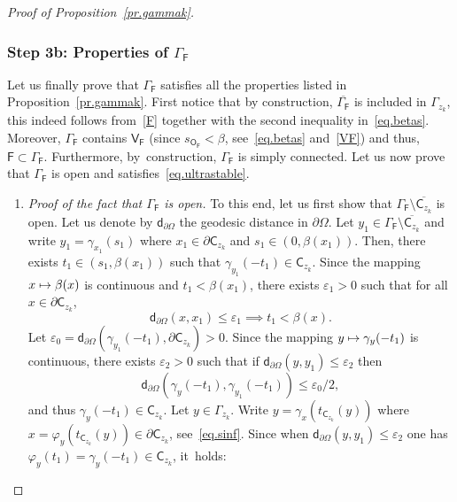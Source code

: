 \documentclass[10pt]{amsart}
\newcommand\mto{\mathchoice{\longmapsto}{\mapsto}{\mapsto}{\mapsto}}
\let\pa\partial
\let\ve\varepsilon
\theoremstyle{plain}
\theoremstyle{definition}
\begin{document}
\begin{proof}[Proof of Proposition~\ref{pr.gammak}]
\subsubsection*{Step 3b: Properties of $ \Gamma_{\mathsf F}$} Let us finally prove that $ \Gamma_{\mathsf F}$ satisfies all the properties listed in Proposition~\ref{pr.gammak}. First notice that by construction, $\overline{ \Gamma_{\mathsf F}}$ is included in $\Gamma_{z_k}$, this indeed follows from~\eqref{F} together with the second inequality in~\eqref{eq.betas}. Moreover, $ \Gamma_{\mathsf F}$ contains $\mathsf V_{\mathsf F}$ (since $s_{\mathsf O_{\mathsf F}}<\beta$, see~\eqref{eq.betas} and~\eqref{VF}) and thus, $\mathsf F\subset \Gamma_{\mathsf F}$. Furthermore, by~construction, $\Gamma_{\mathsf F}$ is simply connected.
Let us now prove that $ \Gamma_{\mathsf F}$ is open and satisfies~\eqref{eq.ultrastable}.
\begin{enumerate}
\item
\emph{Proof of the fact that $ \Gamma_{\mathsf F}$ is open.} To this end, let us first show that $ \Gamma_{\mathsf F}\setminus \overline{ \mathsf C_{z_k}}$ is open.
Let us denote by $\mathsf d_{\partial \Omega}$ the geodesic distance in $\partial \Omega$. Let $y_1\in \Gamma_{\mathsf F}\setminus \overline{ \mathsf C_{z_k}}$
and write $y_1=\gamma_{x_1}(s_1)$ where $x_1\in \pa \mathsf C_{z_k}$ and $s_1\in (0,\beta(x_1))$.
Then, there exists $t_1\in (s_1, \beta(x_1))$ such that $\gamma_{y_1}(-t_1)\in \mathsf C_{z_k}$.
Since the mapping $x\mto \beta(x)$ is continuous and $t_1<\beta(x_1)$, there exists $\ve_1>0$ such that for all $x\in \pa \mathsf C_{z_k}$,
\begin{equation}\label{eq.fitsve}
\mathsf d_{\partial \Omega}\left(x,x_1\right)\leq \ve_1 \implies t_1<\beta(x).
\end{equation}
Let $\ve_0=\mathsf d_{\partial \Omega}(\gamma_{y_1}(-t_1),\partial \mathsf C_{z_k}) >0$.
Since the mapping $y\mto \gamma_y(-t_1)$ is continuous, there exists $\ve_2>0$ such that if $\mathsf d_{\partial \Omega}\left(y,y_1\right)\leq \ve_2$ then
\[
\mathsf d_{\partial \Omega}(\gamma_y(-t_1),\gamma_{y_1}(-t_1))\leq \ve_0/2,
\]
and thus $\gamma_y(-t_1)\in \mathsf C_{z_k}$.
Let $y\in \Gamma_{z_k}$.
Write $y=\gamma_x(t_{\mathsf C_{z_k}}(y))$ where $x= \varphi_{y}(t_{\mathsf C_{z_k}}(y))\in \pa \mathsf C_{z_k}$, see~\eqref{eq.sinf}. Since when $\mathsf d_{\partial \Omega}\left(y,y_1\right)\leq \ve_2$ one has $\varphi_y(t_1)=\gamma_y(-t_1)\in \mathsf C_{z_k}$, it~holds:
\begin{equation}\label{eq.fitsve2}

\end{equation}
\end{enumerate}
\end{proof}
\end{document}
